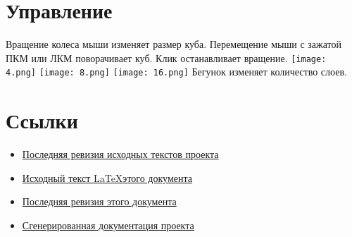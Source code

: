 \documentclass[a4paper,11pt]{article}
\begin{document}
  \newpage
  \part{Управление}
  Вращение колеса мыши изменяет размер куба. 
  Перемещение мыши с зажатой ПКМ или ЛКМ поворачивает куб. Клик останавливает вращение. \linebreak
  \texttt{[image: 4.png]}
  \texttt{[image: 8.png]}
  \texttt{[image: 16.png]}
  Бегунок изменяет количество слоев.
  \newpage
\part{Ссылки}
  \begin{itemize}
    \item \href{https://github.com/DziedMaroz/Cube/tree/ColorCube/src/Cube}{Последняя ревизия исходных текстов проекта}
    \item \href{https://github.com/DziedMaroz/Cube/blob/ColorCube/readme/readme.tex}{Исходный текст \LaTeX   этого документа}
    \item \href{https://github.com/DziedMaroz/Cube/blob/ColorCube/readme/readme.pdf?raw=true}{Последняя ревизия этого документа}
    \item \href{http://dziedmaroz.github.com/colorcube/}{Сгенерированная документация проекта} 
  \end{itemize}
\end{document}
